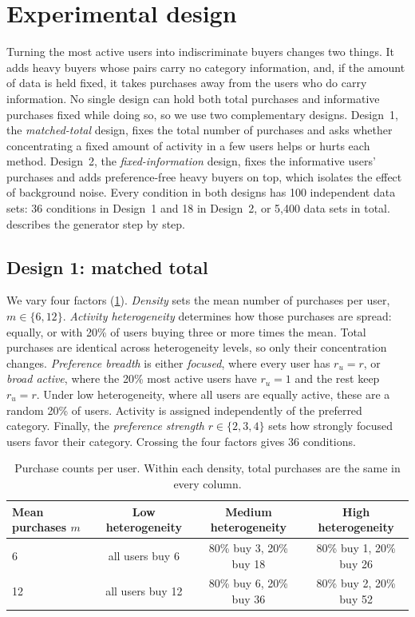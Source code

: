 \documentclass[12pt]{article}
\begin{document}
\section{Experimental design}

Turning the most active users into indiscriminate buyers changes two things. It adds heavy buyers whose pairs carry no category information, and, if the amount of data is held fixed, it takes purchases away from the users who do carry information. No single design can hold both total purchases and informative purchases fixed while doing so, so we use two complementary designs. Design~1, the \emph{matched-total} design, fixes the total number of purchases and asks whether concentrating a fixed amount of activity in a few users helps or hurts each method. Design~2, the \emph{fixed-information} design, fixes the informative users' purchases and adds preference-free heavy buyers on top, which isolates the effect of background noise. Every condition in both designs has 100 independent data sets: 36 conditions in Design~1 and 18 in Design~2, or 5{,}400 data sets in total.  describes the generator step by step.

\subsection{Design 1: matched total}

We vary four factors (\cref{tab:design}). \emph{Density} sets the mean number of purchases per user, $m\in\{6,12\}$. \emph{Activity heterogeneity} determines how those purchases are spread: equally, or with 20\% of users buying three or more times the mean. Total purchases are identical across heterogeneity levels, so only their concentration changes. \emph{Preference breadth} is either \emph{focused}, where every user has $r_u=r$, or \emph{broad active}, where the 20\% most active users have $r_u=1$ and the rest keep $r_u=r$. Under low heterogeneity, where all users are equally active, these are a random 20\% of users. Activity is assigned independently of the preferred category. Finally, the \emph{preference strength} $r\in\{2,3,4\}$ sets how strongly focused users favor their category. Crossing the four factors gives 36 conditions.

\begin{table}[t]
  \centering
  \caption{Purchase counts per user. Within each density, total purchases are the same in every column.}
  \label{tab:design}
  \begin{tabular}{@{}lccc@{}}
    \toprule
    Mean purchases $m$ & Low heterogeneity & Medium heterogeneity & High heterogeneity \\
    \midrule
    6  & all users buy 6  & 80\% buy 3, 20\% buy 18 & 80\% buy 1, 20\% buy 26 \\
    12 & all users buy 12 & 80\% buy 6, 20\% buy 36 & 80\% buy 2, 20\% buy 52 \\
    \bottomrule
  \end{tabular}
\end{table}
\end{document}
